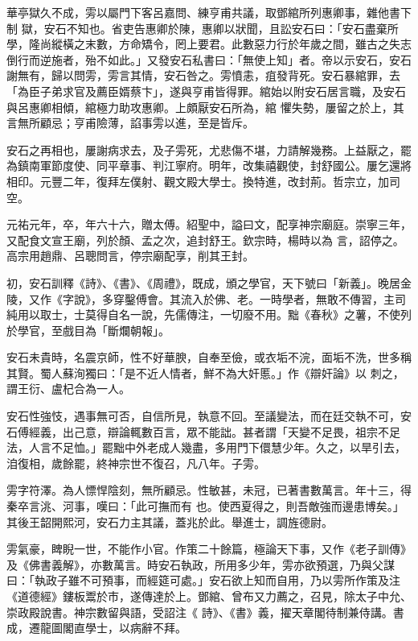 \begin{pinyinscope}
 華亭獄久不成，雱以屬門下客呂嘉問、練亨甫共議，取鄧綰所列惠卿事，雜他書下制
 獄，安石不知也。省吏告惠卿於陳，惠卿以狀聞，且訟安石曰：「安石盡棄所學，隆尚縱橫之末數，方命矯令，罔上要君。此數惡力行於年歲之間，雖古之失志倒行而逆施者，殆不如此。」又發安石私書曰：「無使上知」者。帝以示安石，安石謝無有，歸以問雱，雱言其情，安石咎之。雱憤恚，疽發背死。安石暴綰罪，去「為臣子弟求官及薦臣婿蔡卞」，遂與亨甫皆得罪。綰始以附安石居言職，及安石與呂惠卿相傾，綰極力助攻惠卿。上頗厭安石所為，綰
 懼失勢，屢留之於上，其言無所顧忌；亨甫險薄，諂事雱以進，至是皆斥。



 安石之再相也，屢謝病求去，及子雱死，尤悲傷不堪，力請解幾務。上益厭之，罷為鎮南軍節度使、同平章事、判江寧府。明年，改集禧觀使，封舒國公。屢乞還將相印。元豐二年，復拜左僕射、觀文殿大學士。換特進，改封荊。哲宗立，加司空。



 元祐元年，卒，年六十六，贈太傅。紹聖中，謚曰文，配享神宗廟庭。崇寧三年，又配食文宣王廟，列於顏、孟之次，追封舒王。欽宗時，楊時以為
 言，詔停之。高宗用趙鼎、呂聰問言，停宗廟配享，削其王封。



 初，安石訓釋《詩》、《書》、《周禮》，既成，頒之學官，天下號曰「新義」。晚居金陵，又作《字說》，多穿鑿傅會。其流入於佛、老。一時學者，無敢不傳習，主司純用以取士，士莫得自名一說，先儒傳注，一切廢不用。黜《春秋》之薯，不使列於學官，至戲目為「斷爛朝報」。



 安石未貴時，名震京師，性不好華腴，自奉至儉，或衣垢不浣，面垢不洗，世多稱其賢。蜀人蘇洵獨曰：「是不近人情者，鮮不為大奸慝。」作《辯奸論》以
 刺之，謂王衍、盧杞合為一人。



 安石性強忮，遇事無可否，自信所見，執意不回。至議變法，而在廷交執不可，安石傅經義，出己意，辯論輒數百言，眾不能詘。甚者謂「天變不足畏，祖宗不足法，人言不足恤。」罷黜中外老成人幾盡，多用門下儇慧少年。久之，以旱引去，洎復相，歲餘罷，終神宗世不復召，凡八年。子雱。



 雱字符澤。為人慓悍陰刻，無所顧忌。性敏甚，未冠，已著書數萬言。年十三，得秦卒言洮、河事，嘆曰：「此可撫而有
 也。使西夏得之，則吾敵強而邊患博矣。」其後王韶開熙河，安石力主其議，蓋兆於此。舉進士，調旌德尉。



 雱氣豪，睥睨一世，不能作小官。作策二十餘篇，極論天下事，又作《老子訓傳》及《佛書義解》，亦數萬言。時安石執政，所用多少年，雱亦欲預選，乃與父謀曰：「執政子雖不可預事，而經筵可處。」安石欲上知而自用，乃以雱所作策及注《道德經》鏤板鬻於市，遂傳達於上。鄧綰、曾布又力薦之，召見，除太子中允、崇政殿說書。神宗數留與語，受詔注《
 詩》、《書》義，擢天章閣待制兼侍講。書成，遷龍圖閣直學士，以病辭不拜。




\end{pinyinscope}
